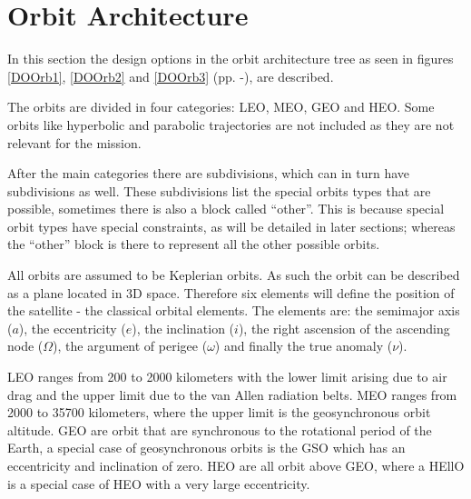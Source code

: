 \section{Orbit Architecture}
\label{designOptionsOrbit}
In this section the design options in the orbit architecture tree as seen in figures \ref{DOOrb1}, \ref{DOOrb2} and \ref{DOOrb3} (pp. \pageref{DOOrb1}-\pageref{DOOrb1}), are described. 

The orbits are divided in four categories: \ac{LEO}, \ac{MEO}, \ac{GEO} and \ac{HEO}. Some orbits like hyperbolic and parabolic trajectories are not included as they are not relevant for the mission.

After the main categories there are subdivisions, which can in turn have subdivisions as well. These subdivisions list the special orbits types that are possible, sometimes there is also a block called ``other''. This is because special orbit types have special constraints, as will be detailed in later sections; whereas the ``other'' block is there to represent all the other possible orbits.

All orbits are assumed to be Keplerian orbits. As such the orbit can be described as a plane located in 3D space. Therefore six elements will define the position of the satellite - the classical orbital elements. The elements are: the semimajor axis ($a$), the eccentricity ($e$), the inclination ($i$), the right ascension of the ascending node ($\Omega$), the argument of perigee ($\omega$) and finally the true anomaly ($\nu$).

\acs{LEO} ranges from 200 to 2000 kilometers with the lower limit arising due to air drag and the upper limit due to the van Allen radiation belts. \acs{MEO} ranges from 2000 to 35700 kilometers, where the upper limit is the geosynchronous orbit altitude.
\acs{GEO} are orbit that are synchronous to the rotational period of the Earth, a special case of geosynchronous orbits is the \ac{GSO} which has an eccentricity and inclination of zero.
\acs{HEO} are all orbit above \ac{GEO}, where a \ac{HEllO} is a special case of \acs{HEO} with a very large eccentricity.